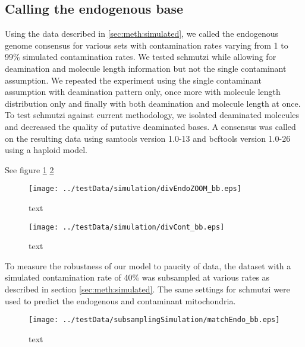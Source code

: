 \documentclass[a4paper,12pt]{article}
\begin{document}
\clearpage

\subsection{Calling the endogenous base}

Using the data described in \ref{sec:meth:simulated}, we called the endogenous genome consensus for various sets with contamination rates varying from 1 to 99\% simulated contamination rates. We tested schmutzi while allowing for deamination and molecule length information but not the single contaminant assumption. We repeated the experiment using the single contaminant assumption with deamination pattern only, once more with molecule length distribution only and finally with both deamination and molecule length at once. To test schmutzi against current methodology, we isolated deaminated molecules and decreased the quality of putative deaminated bases. A consensus was called on the resulting data using samtools version 1.0-13 and bcftools version 1.0-26  using a haploid model.

See figure \ref{fig:endocallingendo} \ref{fig:endocallingcont}

\begin{figure}[H]
\centering
\texttt{[image: ../testData/simulation/divEndoZOOM\_bb.eps]} 
\caption{text}
\label{fig:endocallingendo}
\end{figure}

\begin{figure}[H]
\centering
\texttt{[image: ../testData/simulation/divCont\_bb.eps]} 
\caption{text}
\label{fig:endocallingcont}
\end{figure}




To measure the robustness of our model to paucity of data, the dataset with a simulated contamination rate of 40\% was subsampled at various rates as described in section \ref{sec:meth:simulated}. The same settings for schmutzi were used to predict the endogenous and contaminant mitochondria. 


\begin{figure}[H]
\centering
\texttt{[image: ../testData/subsamplingSimulation/matchEndo\_bb.eps]} 
\caption{text}
\label{fig:endocallingSUBendo}
\end{figure}
\end{document}
